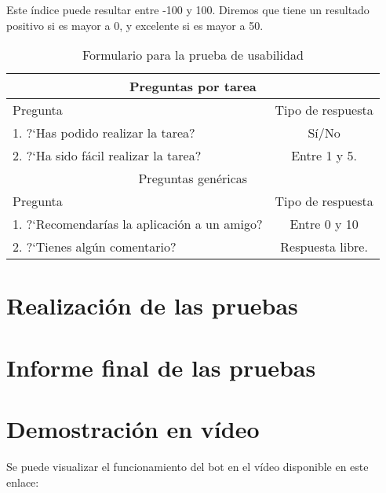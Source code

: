 Este índice puede resultar entre -100 y 100. Diremos que tiene un resultado positivo si es mayor a 0, y excelente si es mayor a 50.


\begin{table}[]
    \centering
    \begin{tabular}{|l|c|}
        \hline
        \multicolumn{2}{|c|}{Preguntas por tarea} \\
        \hline
        Pregunta & Tipo de respuesta \\
        \hline
        1. ?`Has podido realizar la tarea? & Sí/No \\
        \hline
        2. ?`Ha sido fácil realizar la tarea? & Entre 1 y 5. \\
        \hline
        \hline
        \multicolumn{2}{|c|}{Preguntas genéricas} \\
        \hline
        Pregunta & Tipo de respuesta \\
        \hline
        1. ?`Recomendarías la aplicación a un amigo? & Entre 0 y 10 \\
        \hline
        2. ?`Tienes algún comentario? & Respuesta libre. \\
        \hline
    \end{tabular}
    \caption{Formulario para la prueba de usabilidad}
    \label{tab:preguntasPrueba}
\end{table}

\section{Realización de las pruebas}


\section{Informe final de las pruebas}



\section{Demostración en vídeo}

Se puede visualizar el funcionamiento del bot en el vídeo disponible en este enlace:
\url{}

